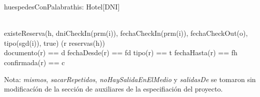 \begin{problema}{huespedesConPalabra}{this: Hotel}{[DNI]}    
    \vspace{3mm}

	{
	}
	{
		\\
		existeReserva(h, dniCheckIn(prm(i)), fechaCheckIn(prm(i)), fechaCheckOut(o), tipo(sgd(i)), true)
	}
	{
		(\exists r \selec reservas(h)) \\
		documento(r) == d \land fechaDesde(r) == fd \land tipo(r) == t \land
		fechaHasta(r) == fh \land confirmada(r) == c
	}
\end{problema}

\noindent Nota: \emph{mismos}, \emph{sacarRepetidos}, \emph{noHaySalidaEnElMedio} y \emph{salidasDe} se tomaron sin modificacíón de la sección de auxiliares de la especifiación del proyecto.\\